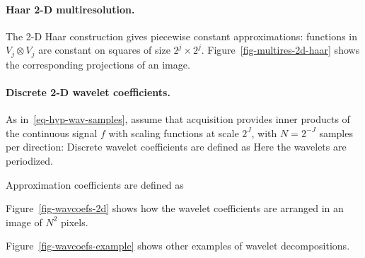 

  
\paragraph{Haar 2-D multiresolution.}

The 2-D Haar construction gives piecewise constant approximations: functions in $V_j \otimes V_j$ are constant on squares of size $2^j \times 2^j$. Figure~\ref{fig-multires-2d-haar} shows the corresponding projections of an image.


  
\paragraph{Discrete 2-D wavelet coefficients.}

As in~\eqref{eq-hyp-wav-samples}, assume that acquisition provides inner products of the continuous signal $f$ with scaling functions at scale $2^J$, with $N=2^{-J}$ samples per direction:
Discrete wavelet coefficients are defined as
Here the wavelets are periodized.
 
Approximation coefficients are defined as


Figure~\ref{fig-wavcoefs-2d} shows how the wavelet coefficients are arranged in an image of $N^2$ pixels.
 
Figure~\ref{fig-wavcoefs-example} shows other examples of wavelet decompositions.

